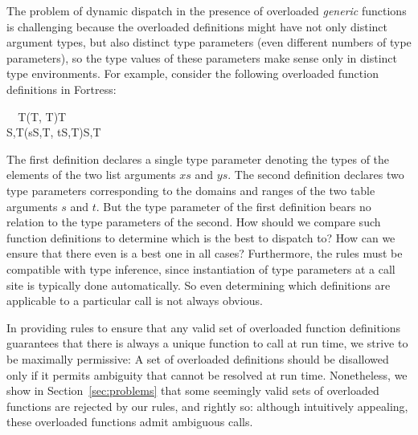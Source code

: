 The problem of dynamic dispatch 
in the presence of overloaded \emph{generic} functions 
is challenging 
because the overloaded definitions
might have not only distinct argument types, 
but also distinct type parameters 
(even different numbers of type parameters), 
so the type values of these parameters 
make sense only in distinct type environments. 
For example, consider the following overloaded function definitions in Fortress:
\small
\begin{FortressCode}
{\tt ~~}\+\llbracket{}T\rrbracket\bigl(\COLON {}\llbracket{}T\rrbracket, \COLON {}\llbracket{}T\rrbracket\bigr)\COLON {}\llbracket{}T\rrbracket \\
  \llbracket{}S,T\rrbracket\bigl(s\COLON {}\llbracket{}S,T\rrbracket, t\COLON {}\llbracket{}S,T\rrbracket\bigr)\COLON {}\llbracket{}S,T\rrbracket\-
\end{FortressCode}
\normalsize
The first definition declares a single
type parameter denoting the types of the elements of the two
list arguments $xs$ and $ys$. The second definition declares two 
type parameters corresponding to the domains and ranges of the two
table arguments $s$ and $t$. But the type parameter of the first
definition bears no relation to the type parameters of the second.
How should we compare such function definitions 
to determine which is the best to dispatch to?
How can we ensure that there even is a best one in all cases?
Furthermore, the rules must be compatible with type inference, 
since instantiation of type parameters at a call site 
is typically done automatically.
So even determining which definitions are applicable 
to a particular call is not always obvious.

In providing rules to ensure 
that any valid set of overloaded function definitions 
guarantees that there is always a unique function to call at run time, 
we strive to be maximally permissive: 
A set of overloaded definitions should be disallowed 
only if it permits ambiguity
that cannot be resolved at run time.  
Nonetheless, 
we show in Section~\ref{sec:problems} 
that some seemingly valid sets of overloaded functions are rejected by our rules, 
and rightly so: 
although intuitively appealing, 
these overloaded functions admit ambiguous calls.

